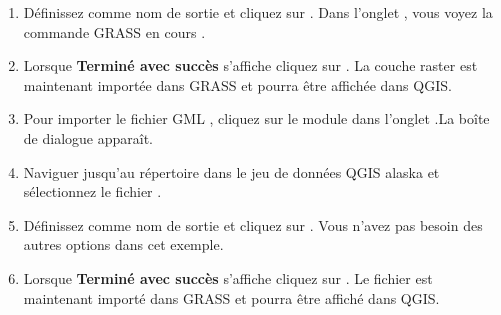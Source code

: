 \begin{enumerate}
  \item Définissez  comme nom de sortie et cliquez sur . Dans l'onglet , vous voyez la commande GRASS en cours .
  \item Lorsque \textbf{Terminé avec succès} s'affiche cliquez sur . 
  La couche raster  est maintenant importée dans GRASS et pourra être affichée dans QGIS.
  
  \item Pour importer le fichier GML , cliquez sur le module  dans l'onglet .La boîte de dialogue   apparaît.
  \item Naviguer jusqu'au répertoire  dans le jeu de données QGIS alaska et sélectionnez le fichier .
  \item Définissez  comme nom de sortie et cliquez sur . Vous n'avez pas besoin des autres options dans cet exemple.
  \item Lorsque \textbf{Terminé avec succès} s'affiche cliquez sur . 
  Le fichier  est maintenant importé dans GRASS et pourra être affiché dans QGIS.
\end{enumerate}


